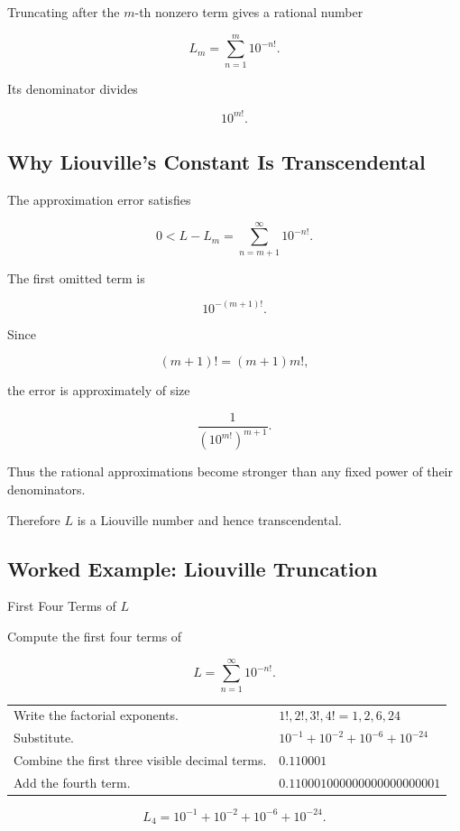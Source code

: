 Truncating after the \(m\)-th nonzero term gives a rational number

\[ L_m=\sum_{n=1}^{m}10^{-n!}. \]

Its denominator divides

\[ 10^{m!}. \]

\subsection{Why Liouville's Constant Is Transcendental}
\label{subsec:liouville-constant-proof-idea}

The approximation error satisfies

\[ 0<L-L_m=\sum_{n=m+1}^{\infty}10^{-n!}. \]

The first omitted term is

\[ 10^{-(m+1)!}. \]

Since

\[ (m+1)!=(m+1)m!, \]

the error is approximately of size

\[ \frac1{(10^{m!})^{m+1}}. \]

Thus the rational approximations become stronger than any fixed power of
their denominators.

Therefore \(L\) is a Liouville number and hence transcendental.

\subsection{Worked Example: Liouville Truncation}
\label{subsec:worked-liouville-truncation}

\begin{workedexamplebox}{First Four Terms of \(L\)}

Compute the first four terms of

\[ L=\sum_{n=1}^{\infty}10^{-n!}. \]

\begin{tabularx}{\textwidth}{@{}>{\raggedright\arraybackslash}p{}X@{}}
Write the factorial exponents. & \(1!,2!,3!,4!=1,2,6,24\)\\
Substitute. & \(10^{-1}+10^{-2}+10^{-6}+10^{-24}\)\\
Combine the first three visible decimal terms. & \(0.110001\)\\
Add the fourth term. & \(0.110001000000000000000001\)
\end{tabularx}

\begin{answerbox}
\[ \boxed{L_4=10^{-1}+10^{-2}+10^{-6}+10^{-24}.} \]
\end{answerbox}
\end{workedexamplebox}

